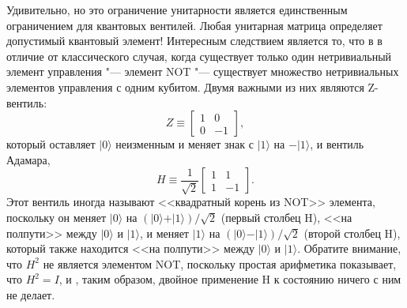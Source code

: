 \begin{multicols}{2}
{        Удивительно, но это ограничение унитарности является единственным ограничением для квантовых вентилей. Любая
        унитарная матрица определяет допустимый квантовый элемент! Интересным следствием является то, что в
        в отличие от классического случая, когда существует только один нетривиальный элемент управления "--- элемент NOT "--- существует множество нетривиальных элементов управления с одним кубитом. Двумя важными из них 
        являются Z-вентиль:
        \begin{equation}
            Z \equiv \begin{bmatrix}
                1& 0\\
                0& -1
            \end{bmatrix},
        \end{equation}
        который оставляет $\vert0\rangle$ неизменным и меняет знак с $\vert1\rangle$ на $-\vert1\rangle$, и вентиль Адамара,
        \begin{equation}
            H\equiv \frac{1}{\sqrt2} \begin{bmatrix}
                1& 1\\
                1& -1
            \end{bmatrix}.
        \end{equation}
        Этот вентиль иногда называют <<квадратный корень из NOT>> элемента, поскольку он меняет $\vert0\rangle$ на $(\vert0\rangle + \vert1\rangle) / \sqrt2$ (первый столбец H), <<на полпути>> между $\vert0\rangle$ и $\vert1\rangle$, 
        и меняет $\vert1\rangle$ на $(\vert0\rangle - \vert1\rangle) / \sqrt2$ (второй столбец H), который также находится <<на полпути>> между $\vert0\rangle$ и $\vert1\rangle$.
        Обратите внимание, что $H^2$ не является элементом NOT, поскольку простая арифметика показывает, что $H^2 = I$, и
        , таким образом, двойное применение H к состоянию ничего с ним не делает.

}
\end{multicols}
